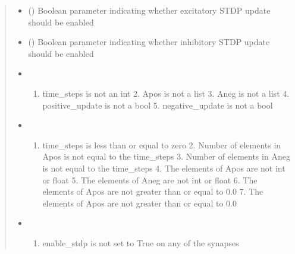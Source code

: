 \documentclass[letterpaper,10pt,english]{sphinxmanual}
\begin{document}
\begin{fulllineitems}
\begin{fulllineitems}
\begin{quote}
\begin{description}
\begin{itemize}
\item {} 
\sphinxAtStartPar
{} () \textendash{} Boolean parameter indicating whether excitatory STDP update should be enabled

\item {} 
\sphinxAtStartPar
{} () \textendash{} Boolean parameter indicating whether inhibitory STDP update should be enabled

\end{itemize}

\begin{itemize}
\item {} 
\sphinxAtStartPar
{} \textendash{} \begin{enumerate}
%
\item {} 
\sphinxAtStartPar
time\_steps is not an int
    2. Apos is not a list
    3. Aneg is not a list
    4. positive\_update is not a bool
    5. negative\_update is not a bool

\end{enumerate}


\item {} 
\sphinxAtStartPar
{} \textendash{} \begin{enumerate}
%
\item {} 
\sphinxAtStartPar
time\_steps is less than or equal to zero
    2. Number of elements in Apos is not equal to the time\_steps
    3. Number of elements in Aneg is not equal to the time\_steps
    4. The elements of Apos are not int or float
    5. The elements of Aneg are not int or float
    6. The elements of Apos are not greater than or equal to 0.0
    7. The elements of Apos are not greater than or equal to 0.0

\end{enumerate}


\item {} 
\sphinxAtStartPar
{} \textendash{} \begin{enumerate}
%
\item {} 
\sphinxAtStartPar
enable\_stdp is not set to True on any of the synapses

\end{enumerate}


\end{itemize}

\end{description}\end{quote}

\end{fulllineitems}


\end{fulllineitems}




\renewcommand{\indexname}{Index}
\printindex
\end{document}
